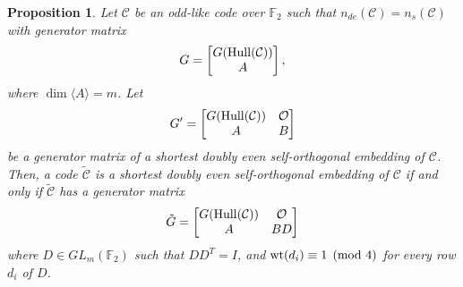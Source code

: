 \documentclass{article}
\newtheorem{proposition}[theorem]{Proposition}
\theoremstyle{definition}
\theoremstyle{remark}
\begin{document}
\begin{proposition}\label{oddalg}
    Let $\mathcal{C}$ be an odd-like code over $\mathbb{F}_2$ such that $n_{de}(\mathcal{C})=n_s(\mathcal{C})$ with generator matrix
    \[
    G=\begin{bmatrix}
        G({\rm Hull}(\mathcal{C}))\\A
    \end{bmatrix},
    \]
    where $\dim\langle A\rangle=m$. Let
    \[
    G'=\begin{bmatrix}
       G({\rm Hull}(\mathcal{C})) & \mathcal{O}\\A & B
    \end{bmatrix}
    \]
    be a generator matrix of a shortest doubly even self-orthogonal embedding of $\mathcal{C}$. Then, a code $\tilde{\mathcal{C}}$ is a shortest doubly even self-orthogonal embedding of $\mathcal{C}$ if and only if $\tilde{\mathcal{C}}$ has a generator matrix
    \[
    \tilde{G}=\begin{bmatrix}
    G({\rm Hull}(\mathcal{C})) & \mathcal{O}\\A & BD
    \end{bmatrix}
    \]
    where $D\in GL_{m}(\mathbb{F}_2)$ such that $DD^T=I$, and ${\rm wt}(d_i)\equiv 1\pmod 4$ for every row $d_i$ of $D$.
\end{proposition}
\end{document}

